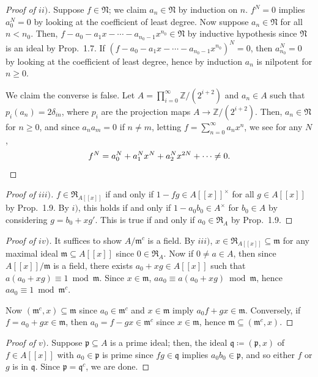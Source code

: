 \documentclass[12pt,letterpaper]{article}
\theoremstyle{definition}
\theoremstyle{remark}
\numberwithin{figure}{problem}
\numberwithin{equation}{section}
\begin{document}
\begin{proof}[Proof of
  $ii)$]
  Suppose
  $f \in
  \mathfrak{N}$; we claim
  $a_n \in
  \mathfrak{N}$ by induction on
  $n$.
  $f^N =
  0$ implies
  $a_0^N =
  0$ by looking at the coefficient of least degree.
  Now suppose
  $a_n \in
  \mathfrak{N}$ for all
  $n <
  n_0$.
  Then,
  $f - a_0 - a_1x - \cdots - a_{n_0-1}x^{n_0} \in
  \mathfrak{N}$ by inductive hypothesis since
  $\mathfrak{N}$ is an ideal by Prop.~1.7.
  If
  $(f - a_0 - a_1x - \cdots - a_{n_0-1}x^{n_0})^N =
  0$, then
  $a_{n_0}^N =
  0$ by looking at the coefficient of least degree, hence by induction
  $a_n$ is nilpotent for
  $n \ge
  0$.
  \par We claim the converse is false.
  Let
  $A = \prod_{i=0}^\infty
  \mathbb{Z}/(2^{i+2})$ and
  $a_n \in
  A$ such that
  $p_i(a_n) =
  2\delta_{in}$, where
  $p_i$ are the projection maps
  $A \to
  \mathbb{Z}/(2^{i+2})$.
  Then,
  $a_n \in
  \mathfrak{N}$ for
  $n \ge
  0$, and since
  $a_na_m =
  0$ if
  $n \ne
  m$, letting
  $f = \sum_{n=0}^\infty
  a_nx^n$, we see for any
  $N$,
  \begin{equation*}
    f^N = a_0^N + a_1^Nx^N + a_2^Nx^{2N} + \cdots \ne 0.\qedhere
  \end{equation*}
\end{proof}
\begin{proof}[Proof of
  $iii)$]
  $f \in
  \mathfrak{R}_{A[[x]]}$ if and only if
  $1 - fg \in
  A[[x]]^\times$ for all
  $g \in
  A[[x]]$ by Prop.~1.9.
  By
  $i)$, this holds if and only if
  $1-a_0b_0 \in
  A^\times$ for
  $b_0 \in
  A$ by considering
  $g = b_0 +
  xg'$.
  This is true if and only if
  $a_0 \in
  \mathfrak{R}_A$ by Prop.~1.9.
\end{proof}
\begin{proof}[Proof of
  $iv)$]
  It suffices to show
  $A/\mathfrak{m}^c$ is a field.
  By
  $iii)$,
  $x \in \mathfrak{R}_{A[[x]]} \subseteq
  \mathfrak{m}$ for any maximal ideal
  $\mathfrak{m} \subseteq
  A[[x]]$ since
  $0 \in
  \mathfrak{R}_A$.
  Now if
  $0 \ne a \in
  A$, then since
  $A[[x]]/\mathfrak{m}$ is a field, there exists
  $a_0 + xg \in
  A[[x]]$ such that
  $a(a_0 + xg) \equiv 1 \bmod
  \mathfrak{m}$.
  Since
  $x \in
  \mathfrak{m}$,
  $aa_0 \equiv a(a_0 + xg) \bmod
  \mathfrak{m}$, hence
  $aa_0 \equiv 1 \bmod
  \mathfrak{m}^c$.
  \par Now
  $(\mathfrak{m}^c,x) \subseteq
  \mathfrak{m}$ since
  $a_0 \in
  \mathfrak{m}^c$ and
  $x \in
  \mathfrak{m}$ imply
  $a_0f + gx \in
  \mathfrak{m}$.
  Conversely, if
  $f = a_0 + gx \in
  \mathfrak{m}$, then
  $a_0 = f - gx \in
  \mathfrak{m}^c$ since
  $x \in
  \mathfrak{m}$, hence
  $\mathfrak{m} \subseteq
  (\mathfrak{m}^c,x)$.
\end{proof}
\begin{proof}[Proof of
  $v)$]
  Suppose
  $\mathfrak{p} \subseteq
  A$ is a prime ideal; then, the ideal
  $\mathfrak{q} \coloneqq
  (\mathfrak{p},x)$ of
  $f \in
  A[[x]]$ with
  $a_0 \in
  \mathfrak{p}$ is prime since
  $fg \in
  \mathfrak{q}$ implies
  $a_0b_0 \in
  \mathfrak{p}$, and so either
  $f$ or
  $g$ is in
  $\mathfrak{q}$.
  Since
  $\mathfrak{p} =
  \mathfrak{q}^c$, we are done.
\end{proof}
\end{document}
